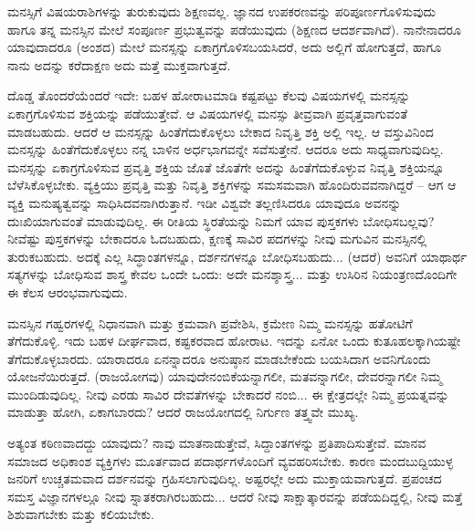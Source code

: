 \vskip 1.5pt

ಮನಸ್ಸಿಗೆ ವಿಷಯರಾಶಿಗಳನ್ನು ತುರುಕುವುದು ಶಿಕ್ಷಣವಲ್ಲ. ಜ್ಞಾನದ ಉಪಕರಣವನ್ನು ಪರಿಪೂರ್ಣಗೊಳಿಸುವುದು ಹಾಗೂ ತನ್ನ ಮನಸ್ಸಿನ ಮೇಲೆ ಸಂಪೂರ್ಣ ಪ್ರಭುತ್ವವನ್ನು ಪಡೆಯುವುದು (ಶಿಕ್ಷಣದ ಆದರ್ಶವಾಗಿದೆ). ನಾನೇನಾದರೂ ಯಾವುದಾದರೂ (ಅಂಶದ) ಮೇಲೆ ಮನಸ್ಸನ್ನು ಏಕಾಗ್ರಗೊಳಿಸಬಯಸಿದರೆ, ಅದು ಅಲ್ಲಿಗೆ ಹೋಗುತ್ತದೆ, ಹಾಗೂ ನಾನು ಅದನ್ನು ಕರೆದಾಕ್ಷಣ ಅದು ಮತ್ತೆ ಮುಕ್ತವಾಗುತ್ತದೆ.

\vskip 1.5pt

ದೊಡ್ಡ ತೊಂದರೆಯೆಂದರೆ ಇದೇ: ಬಹಳ ಹೋರಾಟಮಾಡಿ ಕಷ್ಟಪಟ್ಟು ಕೆಲವು ವಿಷಯಗಳಲ್ಲಿ ಮನಸ್ಸನ್ನು ಏಕಾಗ್ರಗೊಳಿಸುವ ಶಕ್ತಿಯನ್ನು ಪಡೆಯುತ್ತೇವೆ. ಆ ವಿಷಯಗಳಲ್ಲಿ ಮನಸ್ಸು ತೀವ್ರವಾಗಿ ಪ್ರವೃತ್ತವಾಗುವಂತೆ ಮಾಡಬಹುದು. ಆದರೆ ಆ ಮನಸ್ಸನ್ನು ಹಿಂತೆಗೆದುಕೊಳ್ಳಲು ಬೇಕಾದ ನಿವೃತ್ತಿ ಶಕ್ತಿ ಅಲ್ಲಿ ಇಲ್ಲ. ಆ ವಸ್ತುವಿನಿಂದ ಮನಸ್ಸನ್ನು ಹಿಂತೆಗೆದುಕೊಳ್ಳಲು ನನ್ನ ಬಾಳಿನ ಅರ್ಧಭಾಗವನ್ನೇ ಸವೆಸುತ್ತೇನೆ. ಆದರೂ ಅದು ಸಾಧ್ಯವಾಗುವುದಿಲ್ಲ. ಮನಸ್ಸನ್ನು ಏಕಾಗ್ರಗೊಳಿಸುವ ಪ್ರವೃತ್ತಿ ಶಕ್ತಿಯ ಜೊತೆ ಜೊತೆಗೇ ಅದನ್ನು ಹಿಂತೆಗೆದುಕೊಳ್ಳುವ ನಿವೃತ್ತಿ ಶಕ್ತಿಯನ್ನೂ ಬೆಳೆಸಿಕೊಳ್ಳಬೇಕು. ವ್ಯಕ್ತಿಯು ಪ್ರವೃತ್ತಿ ಮತ್ತು ನಿವೃತ್ತಿ ಶಕ್ತಿಗಳನ್ನು ಸಮಸಮವಾಗಿ ಹೊಂದಿರುವವನಾಗಿದ್ದರೆ – ಆಗ ಆ ವ್ಯಕ್ತಿ ಮನುಷ್ಯತ್ವವನ್ನು ಸಾಧಿಸಿದವನಾಗಿರುತ್ತಾನೆ. ಇಡೀ ವಿಶ್ವವೇ ತಲ್ಲಣಿಸಿದರೂ ಯಾವುದೂ ಅವನನ್ನು ದುಃಖಿಯಾಗುವಂತೆ ಮಾಡುವುದಿಲ್ಲ. ಈ ರೀತಿಯ ಸ್ಥಿರತೆಯನ್ನು ನಿಮಗೆ ಯಾವ ಪುಸ್ತಕಗಳು ಬೋಧಿಸಬಲ್ಲವು? ನೀವೆಷ್ಟು ಪುಸ್ತಕಗಳನ್ನು ಬೇಕಾದರೂ ಓದಬಹುದು, ಕ್ಷಣಕ್ಕೆ  ಸಾವಿರ ಪದಗಳನ್ನು ನೀವು ಮಗುವಿನ ಮನಸ್ಸಿನಲ್ಲಿ ತುರುಕಬಹುದು. ಅದಕ್ಕೆ ಎಲ್ಲ ಸಿದ್ಧಾಂತಗಳನ್ನೂ, ದರ್ಶನಗಳನ್ನೂ ಬೋಧಿಸಬಹುದು... (ಆದರೆ) ಅವನಿಗೆ ಯಾಥಾರ್ಥ ಸತ್ಯಗಳನ್ನು ಬೋಧಿಸುವ ಶಾಸ್ತ್ರ ಕೇವಲ ಒಂದೇ ಒಂದು: ಅದೇ ಮನಶ್ಶಾಸ್ತ್ರ... ಮತ್ತು ಉಸಿರಿನ ನಿಯಂತ್ರಣದೊಂದಿಗೇ ಈ ಕೆಲಸ ಆರಂಭವಾಗುವುದು.

\newpage

ಮನಸ್ಸಿನ ಗಹ್ವರಗಳಲ್ಲಿ ನಿಧಾನವಾಗಿ ಮತ್ತು ಕ್ರಮವಾಗಿ ಪ್ರವೇಶಿಸಿ, ಕ್ರಮೇಣ ನಿಮ್ಮ ಮನಸ್ಸನ್ನು ಹತೋಟಿಗೆ ತೆಗೆದುಕೊಳ್ಳಿ. ಇದು ಬಹಳ ದೀರ್ಘವಾದ, ಕಷ್ಟಕರವಾದ ಹೋರಾಟ. ಇದನ್ನು ಏನೋ ಒಂದು ಕುತೂಹಲಕ್ಕಾಗಿಯಷ್ಟೇ ತೆಗೆದುಕೊಳ್ಳಬಾರದು. ಯಾರಾದರೂ ಏನನ್ನಾದರೂ ಅನುಷ್ಠಾನ ಮಾಡಬೇಕೆಂದು ಬಯಸಿದಾಗ ಅವನಿಗೊಂದು ಯೋಜನೆಯಿರುತ್ತದೆ. (ರಾಜಯೋಗವು) ಯಾವುದೇ\break ನಂಬಿಕೆಯನ್ನಾಗಲೀ, ಮತವನ್ನಾಗಲೀ, ದೇವರನ್ನಾಗಲೀ ನಿಮ್ಮ ಮುಂದಿಡುವುದಿಲ್ಲ. ನೀವು ಎರಡು ಸಾವಿರ ದೇವತೆಗಳನ್ನು ಬೇಕಾದರೆ ನಂಬಿ... ಈ ಕ್ಷೇತ್ರದಲ್ಲೇ ನಿಮ್ಮ ಪ್ರಯತ್ನವನ್ನು ಮಾಡುತ್ತಾ ಹೋಗಿ, ಏಕಾಗಬಾರದು? ಆದರೆ ರಾಜಯೋಗದಲ್ಲಿ ನಿರ್ಗುಣ ತತ್ತ್ವವೇ ಮುಖ್ಯ.

\vskip 1.5pt

ಅತ್ಯಂತ ಕಠಿಣವಾದದ್ದು ಯಾವುದು? ನಾವು ಮಾತನಾಡುತ್ತೇವೆ, ಸಿದ್ದಾಂತಗಳನ್ನು ಪ್ರತಿಪಾದಿಸುತ್ತೇವೆ. ಮಾನವ ಸಮಾಜದ ಅಧಿಕಾಂಶ ವ್ಯಕ್ತಿಗಳು ಮೂರ್ತವಾದ ಪದಾರ್ಥಗಳೊಂದಿಗೆ ವ್ಯವಹರಿಸಬೇಕು. ಕಾರಣ ಮಂದಬುದ್ದಿಯುಳ್ಳ ಜನರಿಗೆ ಉಚ್ಚತಮವಾದ ದರ್ಶನವನ್ನು ಗ್ರಹಿಸಲಾಗುವುದಿಲ್ಲ. ಅಷ್ಟರಲ್ಲೇ ಅದು ಮುಕ್ತಾಯವಾಗುತ್ತದೆ. ಪ್ರಪಂಚದ ಸಮಸ್ತ ವಿಜ್ಞಾನಗಳಲ್ಲೂ ನೀವು ಸ್ನಾತಕರಾಗಿರಬಹುದು... ಆದರೆ ನೀವು ಸಾಕ್ಷಾತ್ಕಾರವನ್ನು ಪಡೆಯದಿದ್ದಲ್ಲಿ, ನೀವು ಮತ್ತೆ ಶಿಶುವಾಗಬೇಕು ಮತ್ತು ಕಲಿಯಬೇಕು.

\vskip 1.5pt

